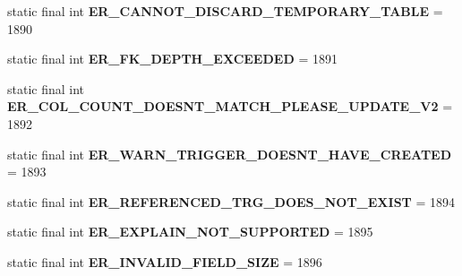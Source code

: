\begin{DoxyCompactItemize}
static final int {\bfseries E\+R\+\_\+\+C\+A\+N\+N\+O\+T\+\_\+\+D\+I\+S\+C\+A\+R\+D\+\_\+\+T\+E\+M\+P\+O\+R\+A\+R\+Y\+\_\+\+T\+A\+B\+LE} = 1890
\item 
\mbox{\label{classcom_1_1mysql_1_1cj_1_1exceptions_1_1_mysql_error_numbers_ad7e048eef17be0ec7a738a5eb1a05180}} 
static final int {\bfseries E\+R\+\_\+\+F\+K\+\_\+\+D\+E\+P\+T\+H\+\_\+\+E\+X\+C\+E\+E\+D\+ED} = 1891
\item 
\mbox{\label{classcom_1_1mysql_1_1cj_1_1exceptions_1_1_mysql_error_numbers_ad3d23fc4392fe7126e969c1f74eb327c}} 
static final int {\bfseries E\+R\+\_\+\+C\+O\+L\+\_\+\+C\+O\+U\+N\+T\+\_\+\+D\+O\+E\+S\+N\+T\+\_\+\+M\+A\+T\+C\+H\+\_\+\+P\+L\+E\+A\+S\+E\+\_\+\+U\+P\+D\+A\+T\+E\+\_\+\+V2} = 1892
\item 
\mbox{\label{classcom_1_1mysql_1_1cj_1_1exceptions_1_1_mysql_error_numbers_add26ec04c1994dca767a196123f23884}} 
static final int {\bfseries E\+R\+\_\+\+W\+A\+R\+N\+\_\+\+T\+R\+I\+G\+G\+E\+R\+\_\+\+D\+O\+E\+S\+N\+T\+\_\+\+H\+A\+V\+E\+\_\+\+C\+R\+E\+A\+T\+ED} = 1893
\item 
\mbox{\label{classcom_1_1mysql_1_1cj_1_1exceptions_1_1_mysql_error_numbers_a51c248ecc4e64e49919662fc50842fc7}} 
static final int {\bfseries E\+R\+\_\+\+R\+E\+F\+E\+R\+E\+N\+C\+E\+D\+\_\+\+T\+R\+G\+\_\+\+D\+O\+E\+S\+\_\+\+N\+O\+T\+\_\+\+E\+X\+I\+ST} = 1894
\item 
\mbox{\label{classcom_1_1mysql_1_1cj_1_1exceptions_1_1_mysql_error_numbers_ace0e03fbd81f3cc4ebed2446e8b68516}} 
static final int {\bfseries E\+R\+\_\+\+E\+X\+P\+L\+A\+I\+N\+\_\+\+N\+O\+T\+\_\+\+S\+U\+P\+P\+O\+R\+T\+ED} = 1895
\item 
\mbox{\label{classcom_1_1mysql_1_1cj_1_1exceptions_1_1_mysql_error_numbers_a9dfa39d2a017813c5ac1871fe61f965a}} 
static final int {\bfseries E\+R\+\_\+\+I\+N\+V\+A\+L\+I\+D\+\_\+\+F\+I\+E\+L\+D\+\_\+\+S\+I\+ZE} = 1896
\item 
\mbox{\label{classcom_1_1mysql_1_1cj_1_1exceptions_1_1_mysql_error_numbers_ac90c8d2504f32ae53c3105c276a91561}} 

\end{DoxyCompactItemize}
